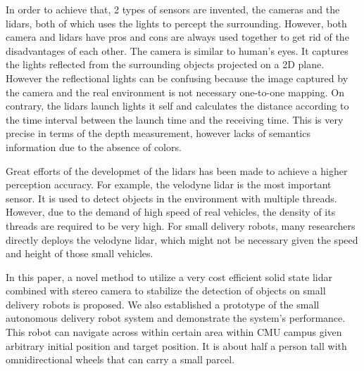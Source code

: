 \documentclass[balance,upint,subscriptcorrection,varvw,nofoot, mathalfa=cal=boondoxo,spanish,french,vietnamese,russian,greek,pdf-a,fontspec,colorlinks]{asmeconf}
\begin{document}
In order to achieve that, 2 types of sensors are invented, the cameras and the lidars, both of which uses the lights to percept the surrounding. However, both camera and lidars have pros and cons are always used together to get rid of the disadvantages of each other. The camera is similar to human's eyes. It captures the lights reflected from the surrounding objects projected on a 2D plane. However the reflectional lights can be confusing because the image captured by the camera and the real environment is not necessary  one-to-one mapping. On contrary, the lidars launch lights it self and calculates the distance according to the time interval between the launch time and the receiving time. This is very precise in terms of the depth measurement, however lacks of semantics information due to the absence of colors. 

Great efforts of the developmet of the lidars has been made to achieve a higher perception accuracy. For example, the velodyne lidar is the most important sensor. It is used to detect objects in the environment with multiple threads. However, due to the demand of high speed of real vehicles, the density of its threads are required to be very high. For small delivery robots, many researchers directly deploys the velodyne lidar, which might not be necessary given the speed and height of those small vehicles. 

In this paper, a novel method to utilize a very cost efficient solid state lidar combined with stereo camera to stabilize the detection of objects on small delivery robots is proposed. We also established a prototype of the small autonomous delivery robot system and demonstrate the system's performance. This robot can navigate across within certain area within CMU campus given arbitrary initial position and target position. It is about half a person tall with omnidirectional wheels that can carry a small parcel.  
\end{document}

